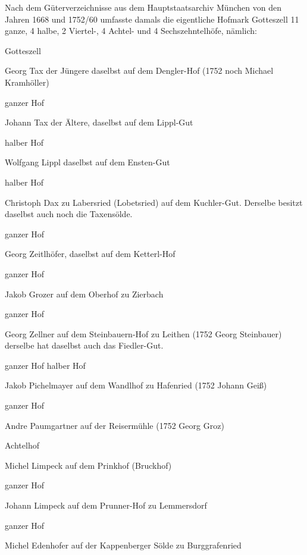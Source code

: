 Nach dem Güterverzeichnisse aus dem Hauptstaatsarchiv München von den Jahren
1668 und 1752/60 umfasste damals die eigentliche Hofmark Gotteszell 11 ganze, 4
halbe, 2 Viertel-, 4 Achtel- und 4 Sechszehntelhöfe, nämlich:



Gotteszell

Georg Tax der Jüngere daselbst auf dem Dengler-Hof (1752 noch Michael
Kramhöller)

ganzer Hof



Johann Tax der Ältere, daselbst auf dem Lippl-Gut

halber Hof



Wolfgang Lippl daselbst auf dem Ensten-Gut

halber Hof



Christoph Dax zu Labersried (Lobetsried) auf dem Kuchler-Gut. Derselbe besitzt
daselbst auch noch die Taxensölde.

ganzer Hof



Georg Zeitlhöfer, daselbst auf dem Ketterl-Hof

ganzer Hof



Jakob Grozer auf dem Oberhof zu Zierbach

ganzer Hof



Georg Zellner auf dem Steinbauern-Hof zu Leithen (1752 Georg Steinbauer)
derselbe hat daselbst auch das Fiedler-Gut.

ganzer Hof halber Hof



Jakob Pichelmayer auf dem Wandlhof zu Hafenried (1752 Johann Geiß)

ganzer Hof



Andre Paumgartner auf der Reisermühle (1752 Georg Groz)

Achtelhof



Michel Limpeck auf dem Prinkhof (Bruckhof)

ganzer Hof



Johann Limpeck auf dem Prunner-Hof zu Lemmersdorf

ganzer Hof



Michel Edenhofer auf der Kappenberger Sölde zu Burggrafenried

